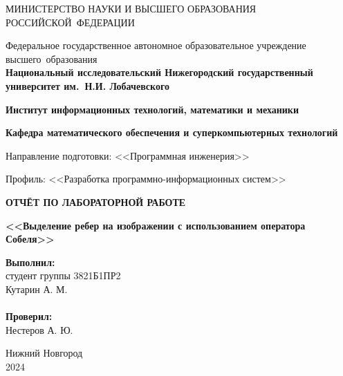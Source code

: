 \documentclass[]{article}
\theoremstyle{remark}
\theoremstyle{definition}
\begin{document}
\begin{titlepage}

\begin{center}
\MakeUppercase{Министерство науки и высшего образования Российской~Федерации}
\end{center}

\begin{center}
Федеральное государственное автономное образовательное учреждение высшего~образования \\
\textbf{Национальный исследовательский Нижегородский государственный университет им.~Н.И. Лобачевского}
\end{center}

\begin{center}
\textbf{Институт информационных технологий, математики и механики}
\end{center}
\begin{center}
\textbf{Кафедра математического обеспечения и суперкомпьютерных технологий}
\end{center}
\begin{center}
Направление подготовки: <<Программная инженерия>>
\end{center}
\begin{center}
Профиль: <<Разработка программно-информационных систем>>
\end{center}

\vspace{3em}

\begin{center}
\textbf{\Large\MakeUppercase{Отчёт по лабораторной работе}} \\
\end{center}
\begin{center}
\textbf{\Large<<Выделение ребер на изображении с использованием оператора Собеля>>} \\
\end{center}

\vspace{5em}

\newbox{\lbox}
\newlength{\maxl}
\setlength{\maxl}{\wd\lbox}
\hfill\parbox{7cm}{
\hspace*{5cm}\hspace*{-5cm}\textbf{Выполнил:} \\ студент группы 	3821Б1ПР2 \\ Кутарин А. М.\\
\\

\hspace*{5cm}\hspace*{-5cm}\textbf{Проверил:} \\ Нестеров А. Ю.
}
\vspace{\fill}

\begin{center} Нижний Новгород \\ 2024 \end{center}

\end{titlepage}
\end{document}
